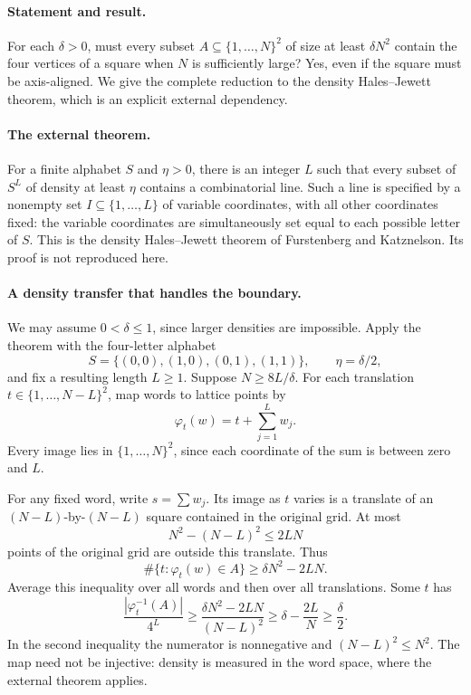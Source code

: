 \paragraph{Statement and result.}
For each \(\delta>0\), must every subset \(A\subseteq\{1,\ldots,N\}^2\) of size at least \(\delta N^2\) contain the four vertices of a square when \(N\) is sufficiently large? Yes, even if the square must be axis-aligned. We give the complete reduction to the density Hales--Jewett theorem, which is an explicit external dependency.

\paragraph{The external theorem.}
For a finite alphabet \(S\) and \(\eta>0\), there is an integer \(L\) such that every subset of \(S^L\) of density at least \(\eta\) contains a combinatorial line. Such a line is specified by a nonempty set \(I\subseteq\{1,\ldots,L\}\) of variable coordinates, with all other coordinates fixed: the variable coordinates are simultaneously set equal to each possible letter of \(S\). This is the density Hales--Jewett theorem of Furstenberg and Katznelson. Its proof is not reproduced here.

\paragraph{A density transfer that handles the boundary.}
We may assume \(0<\delta\leq1\), since larger densities are impossible. Apply the theorem with the four-letter alphabet
\[
 S=\{(0,0),(1,0),(0,1),(1,1)\},\qquad \eta=\delta/2,
\]
and fix a resulting length \(L\geq1\). Suppose \(N\geq8L/\delta\). For each translation \(t\in\{1,\ldots,N-L\}^2\), map words to lattice points by
\[
 \varphi_t(w)=t+\sum_{j=1}^L w_j.
\]
Every image lies in \(\{1,\ldots,N\}^2\), since each coordinate of the sum is between zero and \(L\).

For any fixed word, write \(s=\sum w_j\). Its image as \(t\) varies is a translate of an \((N-L)\)-by-\((N-L)\) square contained in the original grid. At most
\[
 N^2-(N-L)^2\leq2LN
\]
points of the original grid are outside this translate. Thus
\[
 \#\{t:\varphi_t(w)\in A\}\geq\delta N^2-2LN.
\]
Average this inequality over all words and then over all translations. Some \(t\) has
\[
 \frac{|\varphi_t^{-1}(A)|}{4^L}
 \geq\frac{\delta N^2-2LN}{(N-L)^2}
 \geq\delta-\frac{2L}{N}\geq\frac\delta2. \tag{1}
\]
In the second inequality the numerator is nonnegative and \((N-L)^2\leq N^2\). The map need not be injective: density is measured in the word space, where the external theorem applies.

